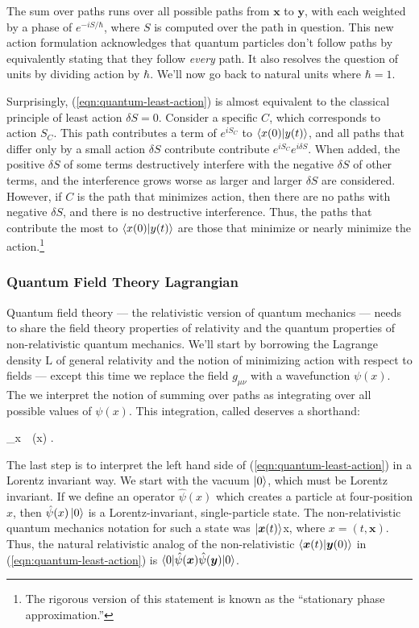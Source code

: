 The sum over paths runs over all possible paths from $\bm x$ to $\bm y$, with each weighted by a phase of $e^{-i S / \hbar}$, where $S$ is computed over the path in question. This new action formulation acknowledges that quantum particles don't follow paths by equivalently stating that they follow \textit{every} path. It also resolves the question of units by dividing action by $\hbar$. We'll now go back to natural units where $\hbar = 1$.

Surprisingly, (\ref{eqn:quantum-least-action}) is almost equivalent to the classical principle of least action $\delta S = 0$. Consider a specific $C$, which corresponds to action $S_C$. This path contributes a term of $e^{iS_C}$ to $\braket{x(0)|y(t)}$, and all paths that differ only by a small action $\delta S$ contribute contribute $e^{iS_C}e^{i\delta S}$. When added, the positive $\delta S$ of some terms destructively interfere with the negative $\delta S$ of other terms, and the interference grows worse as larger and larger $\delta S$ are considered. However, if $C$ is the path that minimizes action, then there are no paths with negative $\delta S$, and there is no destructive interference. Thus, the paths that contribute the most to $\braket{x(0)|y(t)}$ are those that minimize or nearly minimize the action.\footnote{The rigorous version of this statement is known as the ``stationary phase approximation.''}

\subsubsection*{Quantum Field Theory Lagrangian}

Quantum field theory --- the relativistic version of quantum mechanics --- needs to share the field theory properties of relativity and the quantum properties of non-relativistic quantum mechanics. We'll start by borrowing the Lagrange density $\mathrm{L}$ of general relativity and the notion of minimizing action with respect to fields --- except this time we replace the field $g_{\mu \nu}$ with a wavefunction $\psi(x)$. The we interpret the notion of summing over paths as integrating over all possible values of $\psi(x)$. This integration, called  deserves a shorthand:

\begin{e}
  \prod_{x\ \in\ }\int \psi(x) \equiv \int {}\psi.
\end{e}

The last step is to interpret the left hand side of (\ref{eqn:quantum-least-action}) in a Lorentz invariant way. We start with the vacuum $\ket 0$, which must be Lorentz invariant. If we define an operator $\hat \psi(x)$ which creates a particle at four-position $x$, then $\hat \psi(x)\ket{0}$ is a Lorentz-invariant, single-particle state. The non-relativistic quantum mechanics notation for such a state was $\ket{\bm x(t)}$x, where $x = (t, \bm x)$. Thus, the natural relativistic analog of the non-relativistic $\braket{\bm x(t) | \bm y(0)}$ in (\ref{eqn:quantum-least-action}) is $\braket{0 | \hat\psi(\bm x)\hat\psi(\bm y) | 0}$.

